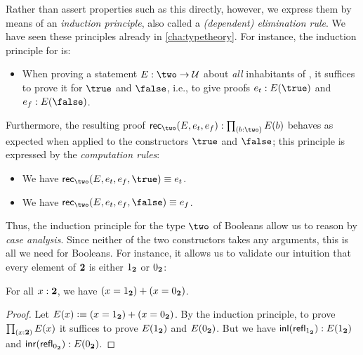Rather than assert properties such as this directly, however, we express them by means of an \emph{induction principle}, also called a \emph{(dependent) elimination rule}.
We have seen these principles already in \autoref{cha:typetheory}.
For instance, the induction principle for \bool is:

\begin{itemize}
\item When proving a statement $E : \two \to \type$ about \emph{all} inhabitants of \bool, it suffices to prove it for $\true$ and $\false$, i.e., to give proofs $ e_t : E(\true)$ and $e_f : E(\false)$.
\end{itemize}

Furthermore, the resulting proof $\rec\two(E,e_t,e_f): \prd{b : \two}E(b)$ behaves as expected when applied to the constructors $\true$ and $\false$; this principle is expressed by the \emph{computation rules}:
\begin{itemize}
\item We have $\rec\two(E,e_t,e_f,\true) \jdeq e_t$.
\item We have $\rec\two(E,e_t,e_f,\false) \jdeq e_f$.
\end{itemize}

Thus, the induction principle for the type $\two$ of Booleans allow us to reason by \emph{case analysis}.
Since neither of the two constructors takes any arguments, this is all we need for Booleans.
For instance, it allows us to validate our intuition that every element of $\mathbf{2}$ is either ${1_{\mathbf{2}}}$ or ${0_{\mathbf{2}}}$:

\begin{lem}\label{thm:allbool-trueorfalse}
  For all $x:\mathbf{2}$, we have $(x={1_{\mathbf{2}}}) + (x={0_{\mathbf{2}}})$.
\end{lem}
\begin{proof}
  Let $E(x)\vcentcolon\equiv (x={1_{\mathbf{2}}}) + (x={0_{\mathbf{2}}})$.
  By the induction principle, to prove $\prd{x:\bool} E(x)$ it suffices to prove $E({1_{\mathbf{2}}})$ and $E({0_{\mathbf{2}}})$.
  But we have ${\mathsf{inl}}(\mathsf{refl}_{{1_{\mathbf{2}}}}):E({1_{\mathbf{2}}})$ and ${\mathsf{inr}}(\mathsf{refl}_{{0_{\mathbf{2}}}}):E({0_{\mathbf{2}}})$.
\end{proof}

